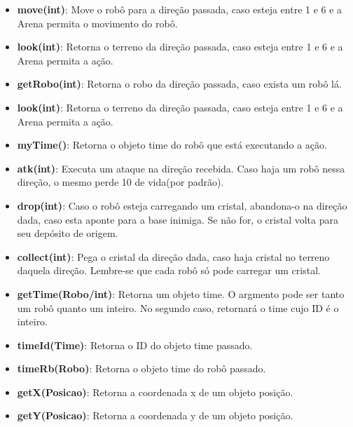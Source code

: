 \documentclass[11pt]{article}
\begin{document}
\begin{itemize}

	\item \textbf{move(int)}: Move o robô para a direção passada, caso esteja entre 1 e 6 e a Arena permita o movimento do robô.

	\item \textbf{look(int)}: Retorna o terreno da direção passada, caso esteja entre 1 e 6 e a Arena permita a ação.
    
    \item \textbf{getRobo(int)}: Retorna o robo da direção passada, caso exista um robô lá.
    
    \item \textbf{look(int)}: Retorna o terreno da direção passada, caso esteja entre 1 e 6 e a Arena permita a ação.
    
    \item \textbf{myTime()}: Retorna o objeto time do robô que está executando a ação.
    
    \item \textbf{atk(int)}: Executa um ataque na direção recebida. Caso haja um robô nessa direção, o mesmo perde 10 de vida(por padrão).
    
    \item \textbf{drop(int)}: Caso o robô esteja carregando um cristal, abandona-o na direção dada, caso esta aponte para a base inimiga. Se não for, o cristal volta para seu depósito de origem. 
    
    \item \textbf{collect(int)}: Pega o cristal da direção dada, caso haja cristal no terreno daquela direção. Lembre-se que cada robô só pode carregar um cristal.
    
    \item \textbf{getTime(Robo/int)}: Retorna um objeto time. O argmento pode ser tanto um robô quanto um inteiro. No segundo caso, retornará o time cujo ID é o inteiro.
    
    \item \textbf{timeId(Time)}: Retorna o ID do objeto time passado.
    
    \item \textbf{timeRb(Robo)}: Retorna o objeto time do robô passado.
    
    \item \textbf{getX(Posicao)}: Retorna a coordenada x de um objeto posição.
	
    \item \textbf{getY(Posicao)}: Retorna a coordenada y de um objeto posição.
    

\end{itemize}
\end{document}
